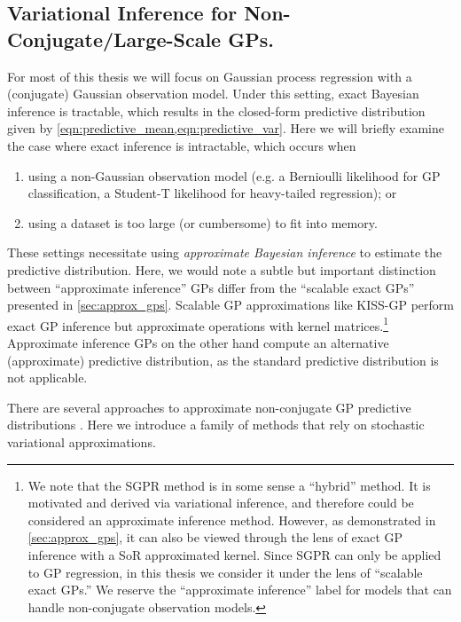 \subsection{Variational Inference for Non-Conjugate/Large-Scale GPs.}
\label{sec:variational}
For most of this thesis we will focus on Gaussian process regression with a (conjugate) Gaussian observation model.
Under this setting, exact Bayesian inference is tractable, which results in the closed-form predictive distribution given by \cref{eqn:predictive_mean,eqn:predictive_var}.
Here we will briefly examine the case where exact inference is intractable, which occurs when
%
\begin{enumerate}
  \item using a non-Gaussian observation model (e.g. a Bernioulli likelihood for GP classification, a Student-T likelihood for heavy-tailed regression); or
  \item using a dataset is too large (or cumbersome) to fit into memory.
\end{enumerate}
%
These settings necessitate using \emph{approximate Bayesian inference} to estimate the predictive distribution.
Here, we would note a subtle but important distinction between ``approximate inference'' GPs differ from the ``scalable exact GPs'' presented in \cref{sec:approx_gps}.
Scalable GP approximations like KISS-GP perform exact GP inference but approximate operations with kernel matrices.\footnote{
  We note that the SGPR method \cite{titsias2009variational} is in some sense a ``hybrid'' method.
  It is motivated and derived via variational inference, and therefore could be considered an approximate inference method.
  However, as demonstrated in \cref{sec:approx_gps}, it can also be viewed through the lens of exact GP inference with a SoR approximated kernel.
  Since SGPR can only be applied to GP regression, in this thesis we consider it under the lens of ``scalable exact GPs.''
  We reserve the ``approximate inference'' label for models that can handle non-conjugate observation models.
}
Approximate inference GPs on the other hand compute an alternative (approximate) predictive distribution, as the standard predictive distribution is not applicable.

There are several approaches to approximate non-conjugate GP predictive distributions \citep{minka2001family,rasmussen2006gaussian,hensman2015mcmc,li2015stochastic}.
Here we introduce a family of methods that rely on stochastic variational approximations.

